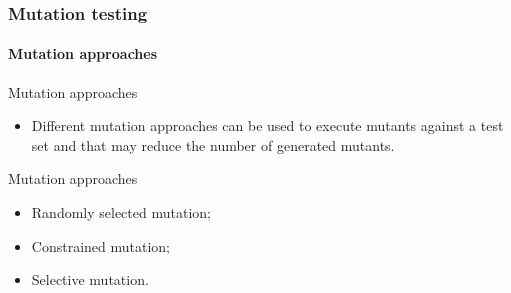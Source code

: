 \begin{frame}[parent={concept:mutation-testing}, hasprev=false, hasnext=false]
\frametitle{Mutation testing}
\framesubtitle{Mutation approaches}

\begin{block:fact}{Mutation approaches}
\begin{itemize}
	\item Different mutation approaches can be used to execute mutants against
	a test set and that may reduce the number of generated mutants.
\end{itemize}
\end{block:fact}


\begin{block:fact}{Mutation approaches}
\begin{itemize}
	\item Randomly selected mutation;
	\item Constrained mutation;
	\item Selective mutation.
\end{itemize}
\end{block:fact}
\end{frame}